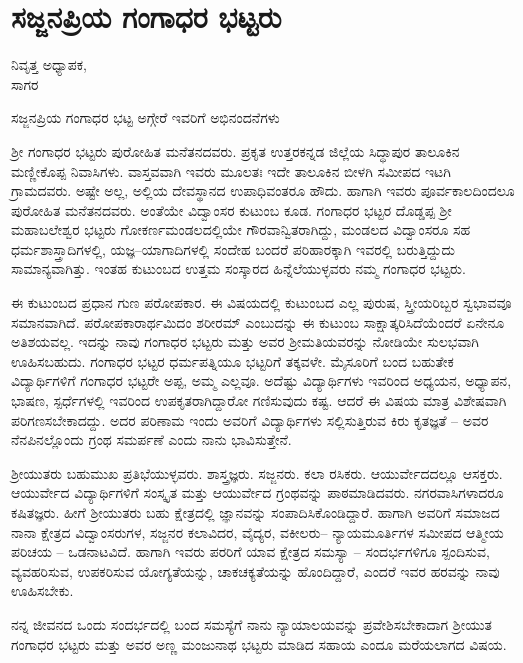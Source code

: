 {\fontsize{14}{16}\selectfont
\chapter{ಸಜ್ಜನಪ್ರಿಯ ಗಂಗಾಧರ ಭಟ್ಟರು}

\begin{center}
\smallskip

ನಿವೃತ್ತ ಅಧ್ಯಾಪಕ,\\ 
ಸಾಗರ
\addrule
\end{center}

ಸಜ್ಜನಪ್ರಿಯ ಗಂಗಾಧರ ಭಟ್ಟ ಅಗ್ಗೇರೆ ಇವರಿಗೆ ಅಭಿನಂದನೆಗಳು

ಶ್ರೀ ಗಂಗಾಧರ ಭಟ್ಟರು ಪುರೋಹಿತ ಮನೆತನದವರು. ಪ್ರಕೃತ  ಉತ್ತರಕನ್ನಡ ಜಿಲ್ಲೆಯ ಸಿದ್ಧಾಪುರ ತಾಲೂಕಿನ ಮಣ್ಣೀಕೊಪ್ಪ ನಿವಾಸಿಗಳು. ವಾಸ್ತವವಾಗಿ ಇವರು ಮೂಲತಃ ಇದೇ ತಾಲೂಕಿನ ಬೀಳಗಿ ಸಮೀಪದ ಇಟಗಿ ಗ್ರಾಮದವರು. ಅಷ್ಟೇ ಅಲ್ಲ, ಅಲ್ಲಿಯ ದೇವಸ್ಥಾನದ ಉಪಾಧಿವಂತರೂ ಹೌದು. ಹಾಗಾಗಿ ಇವರು ಪೂರ್ವಕಾಲದಿಂದಲೂ ಪುರೋಹಿತ ಮನೆತನದವರು. ಅಂತೆಯೇ ವಿದ್ವಾಂಸರ ಕುಟುಂಬ ಕೂಡ. ಗಂಗಾಧರ ಭಟ್ಟರ ದೊಡ್ಡಪ್ಪ ಶ್ರೀ ಮಹಾಬಲೇಶ್ವರ ಭಟ್ಟರು ಗೋಕರ್ಣಮಂಡಲದಲ್ಲಿಯೇ ಗೌರವಾನ್ವಿತರಾಗಿದ್ದು, ಮಂಡಲದ ವಿದ್ವಾಂಸರೂ ಸಹ ಧರ್ಮಶಾಸ್ತ್ರಾದಿಗಳಲ್ಲಿ, ಯಜ್ಞ–ಯಾಗಾದಿಗಳಲ್ಲಿ ಸಂದೇಹ ಬಂದರೆ ಪರಿಹಾರಕ್ಕಾಗಿ ಇವರಲ್ಲಿ ಬರುತ್ತಿದ್ದುದು ಸಾಮಾನ್ಯವಾಗಿತ್ತು. ಇಂತಹ ಕುಟುಂಬದ ಉತ್ತಮ ಸಂಸ್ಕಾರದ ಹಿನ್ನೆಲೆಯುಳ್ಳವರು ನಮ್ಮ ಗಂಗಾಧರ ಭಟ್ಟರು.

ಈ ಕುಟುಂಬದ ಪ್ರಧಾನ ಗುಣ ಪರೋಪಕಾರ. ಈ ವಿಷಯದಲ್ಲಿ ಕುಟುಂಬದ ಎಲ್ಲ ಪುರುಷ, ಸ್ತ್ರೀಯರಿಬ್ಬರ ಸ್ವಭಾವವೂ ಸಮಾನವಾಗಿದೆ. ಪರೋಪಕಾರಾರ್ಥಮಿದಂ ಶರೀರಮ್ ಎಂಬುದನ್ನು ಈ ಕುಟುಂಬ ಸಾಕ್ಷಾತ್ಕರಿಸಿದೆಯೆಂದರೆ ಏನೇನೂ ಅತಿಶಯವಲ್ಲ. ಇದನ್ನು ನಾವು ಗಂಗಾಧರ ಭಟ್ಟರು ಮತ್ತು ಅವರ ಶ್ರೀಮತಿಯವರನ್ನು ನೋಡಿಯೇ ಸುಲಭವಾಗಿ ಊಹಿಸಬಹುದು. ಗಂಗಾಧರ ಭಟ್ಟರ ಧರ್ಮಪತ್ನಿಯೂ ಭಟ್ಟರಿಗೆ ತಕ್ಕವಳೇ. ಮೈಸೂರಿಗೆ ಬಂದ ಬಹುತೇಕ ವಿದ್ಯಾರ್ಥಿಗಳಿಗೆ ಗಂಗಾಧರ ಭಟ್ಟರೇ ಅಪ್ಪ, ಅಮ್ಮ ಎಲ್ಲವೂ. ಅದೆಷ್ಟು ವಿದ್ಯಾರ್ಥಿಗಳು ಇವರಿಂದ ಅಧ್ಯಯನ, ಅಧ್ಯಾಪನ, ಭಾಷಣ, ಸ್ಪರ್ಧೆಗಳಲ್ಲಿ ಇವರಿಂದ ಉಪಕೃತರಾಗಿದ್ದಾರೋ ಗಣಿಸುವುದು ಕಷ್ಟ. ಆದರೆ ಈ ವಿಷಯ ಮಾತ್ರ ವಿಶೇಷವಾಗಿ ಪರಿಗಣಸಬೇಕಾದದ್ದು. ಅದರ ಪರಿಣಾಮ ಇಂದು ಅವರಿಗೆ ವಿದ್ಯಾರ್ಥಿಗಳು ಸಲ್ಲಿಸುತ್ತಿರುವ ಕಿರು ಕೃತಜ್ಞತೆ – ಅವರ ನೆನಪಿನಲ್ಲೊಂದು ಗ್ರಂಥ ಸಮರ್ಪಣೆ ಎಂದು ನಾನು ಭಾವಿಸುತ್ತೇನೆ.

ಶ್ರೀಯುತರು ಬಹುಮುಖ ಪ್ರತಿಭೆಯುಳ್ಳವರು. ಶಾಸ್ತ್ರಜ್ಞರು. ಸಜ್ಜನರು. ಕಲಾ ರಸಿಕರು. ಆಯುರ್ವೇದದಲ್ಲೂ ಆಸಕ್ತರು. ಆಯುರ್ವೇದ ವಿದ್ಯಾರ್ಥಿಗಳಿಗೆ ಸಂಸ್ಕೃತ ಮತ್ತು ಆಯುರ್ವೇದ ಗ್ರಂಥವನ್ನು ಪಾಠಮಾಡಿದವರು. ನಗರವಾಸಿಗಳಾದರೂ ಕಷಿತಜ್ಞರು. ಹೀಗೆ ಶ್ರೀಯುತರು ಬಹು ಕ್ಷೇತ್ರದಲ್ಲಿ ಜ್ಞಾನವನ್ನು ಸಂಪಾದಿಸಿಕೊಂಡಿದ್ದಾರೆ. ಹಾಗಾಗಿ ಅವರಿಗೆ ಸಮಾಜದ ನಾನಾ ಕ್ಷೇತ್ರದ ವಿದ್ವಾಂಸರುಗಳ, ಸಜ್ಜನರ ಕಲಾವಿದರ, ವೈದ್ಯರ, ವಕೀಲರು– ನ್ಯಾಯಮೂರ್ತಿಗಳ ಸಮೀಪದ ಆತ್ಮೀಯ ಪರಿಚಯ – ಒಡನಾಟವಿದೆ. ಹಾಗಾಗಿ ಇವರು ಪರರಿಗೆ ಯಾವ ಕ್ಷೇತ್ರದ ಸಮಸ್ಯಾ – ಸಂದರ್ಭಗಳಿಗೂ ಸ್ಪಂದಿಸುವ, ವ್ಯವಹರಿಸುವ, ಉಪಕರಿಸುವ ಯೋಗ್ಯತೆಯನ್ನು, ಚಾಕಚಕ್ಯತೆಯನ್ನು ಹೊಂದಿದ್ದಾರೆ, ಎಂದರೆ ಇವರ ಹರವನ್ನು ನಾವು ಊಹಿಸಬೇಕು. 

ನನ್ನ ಜೀವನದ ಒಂದು ಸಂದರ್ಭದಲ್ಲಿ  ಬಂದ ಸಮಸ್ಯೆಗೆ ನಾನು ನ್ಯಾಯಾಲಯವನ್ನು ಪ್ರವೇಶಿಸಬೇಕಾದಾಗ ಶ್ರೀಯುತ ಗಂಗಾಧರ ಭಟ್ಟರು ಮತ್ತು ಅವರ ಅಣ್ಣ ಮಂಜುನಾಥ ಭಟ್ಟರು ಮಾಡಿದ ಸಹಾಯ ಎಂದೂ ಮರೆಯಲಾಗದ ವಿಷಯ.

}

